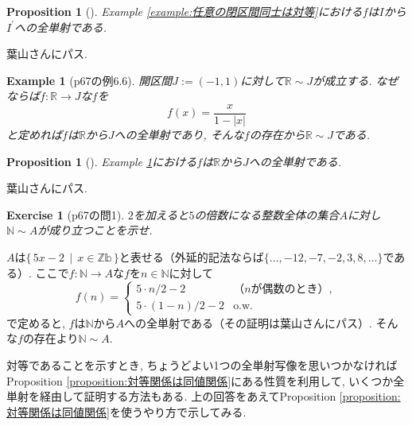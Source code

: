 \documentclass[a4j,dvipdfmx,10pt]{ujreport}
\makeatletter
\theoremstyle{mystyle}
\newtheorem{my-proposition}[my-theorem]{Proposition}
\newtheorem{my-example}[my-theorem]{Example}
\newtheorem{my-exercise}[my-theorem]{Exercise}
\newcommand{\thmsymbol}{$\blacksquare$}
\newenvironment{proposition}[1][]{
  \begin{my-proposition}[#1]%
  \renewcommand{\qedsymbol}{\thmsymbol}\pushQED{\qed}}%
  {\popQED\end{my-proposition}
}
\newenvironment{example}[1][]{
  \begin{my-example}[#1]%
  \renewcommand{\qedsymbol}{\thmsymbol}\pushQED{\qed}}%
  {\popQED\end{my-example}
}
\newenvironment{exercise}[1][]{
  \begin{my-exercise}[#1]%
  \renewcommand{\qedsymbol}{\thmsymbol}\pushQED{\qed}}%
  {\popQED\end{my-exercise}
}
\renewcommand{\proofname}{Proof}
\renewenvironment{proof}[1][\proofname]{\par
  \pushQED{\qed}%
  \normalfont \topsep6\p@\@plus6\p@\relax
  \trivlist
  \item[\hskip\labelsep
        \itshape
    {\bf\underline{#1}\@addpunct{\ }}]\ignorespaces
}{%
  \popQED\endtrivlist\@endpefalse
}
\newenvironment{answer}{\begin{proof}[Answer]}{\end{proof}}
\newcommand{\tempdefeq}{:=}
\newcommand{\dash}[1]{#1 ^{\prime}}
\newcommand{\SetBar}[2]{
  \{\,#1\,\mid\,#2\,\}
}
\newcommand{\map}[3]{#1\colon #2 \to #3}
\makeatother
\begin{document}
\begin{proposition}
  Example \ref{example:任意の閉区間同士は対等}における$f$は$I$から$\dash{I}$への全単射である.
\end{proposition}

\begin{proof}
  葉山さんにパス.
\end{proof}

\begin{example}[p67の例6.6]
  \label{example:開区間と実数全体は対等}
  開区間$J\tempdefeq (-1,1)$に対して$\mathbb{R}\sim J$が成立する.
  なぜならば$\map{f}{\mathbb{R}}{J}$な$f$を
  \begin{equation*}
    f(x)=\frac{x}{1-|x|}
  \end{equation*}
  と定めれば$f$は$\mathbb{R}$から$J$への全単射であり,
  そんな$f$の存在から$\mathbb{R}\sim J$である.
\end{example}

\begin{proposition}
  Example \ref{example:開区間と実数全体は対等}における$f$は$\mathbb{R}$から$J$への全単射である.
\end{proposition}

\begin{proof}
  葉山さんにパス.
\end{proof}

\begin{exercise}[p67の問1]
  $2$を加えると$5$の倍数になる整数全体の集合$A$に対し$\mathbb{N}\sim A$が成り立つことを示せ.
\end{exercise}

\begin{answer}
  $A$は$\SetBar{ 5x-2 }{ x\in \mathbb{Zb} }$と表せる（外延的記法ならば$\{ \dots,-12,-7,-2,3,8,\dots \}$である）.
  ここで$\map{f}{\mathbb{N}}{A}$な$f$を$n\in \mathbb{N}$に対して
  \begin{equation*}
    f(n)=
    \begin{cases}
      5\cdot n/2 -2 & \text{（}n\text{が偶数のとき）},\\
      5\cdot (1-n)/2 -2  & \text{o.w.}
    \end{cases}
  \end{equation*}
  で定めると,
  $f$は$\mathbb{N}$から$A$への全単射である（その証明は葉山さんにパス）.
  そんな$f$の存在より$\mathbb{N}\sim A$.
\end{answer}

\noindent
対等であることを示すとき,
ちょうどよい1つの全単射写像を思いつかなければProposition \ref{proposition:対等関係は同値関係}にある性質を利用して,
いくつか全単射を経由して証明する方法もある.
上の回答をあえてProposition \ref{proposition:対等関係は同値関係}を使うやり方で示してみる.
\end{document}
